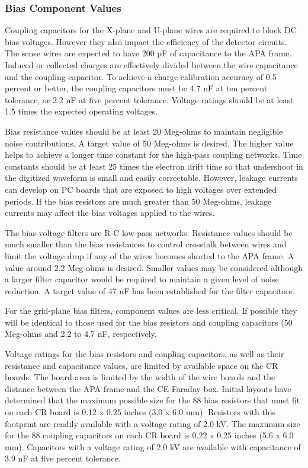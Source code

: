 \subsubsection{Bias Component Values}
\label{subsec:bias_comp_values}

Coupling capacitors for the X-plane and U-plane wires are required to block DC bias voltages. However they also impact the efficiency of the detector circuits. The sense wires are expected to have 200 pF of capacitance to the APA frame. Induced or collected charges are effectively divided between the wire capacitance and the coupling capacitor. To achieve a charge-calibration accuracy of 0.5 percent or better, the coupling capacitors must be 4.7 nF at ten percent tolerance, or 2.2 nF at five percent tolerance. Voltage ratings should be at least 1.5 times the expected operating voltages.

Bias resistance values should be at least 20 Meg-ohms to maintain negligible noise contributions. A target value of 50 Meg-ohms is desired. The higher value helps to achieve a longer time constant for the high-pass coupling networks. Time constants should be at least 25 times the electron drift time so that undershoot in the digitized waveform is small and easily correctable. However, leakage currents can develop on PC boards that are exposed to high voltages over extended periods. If the bias resistors are much greater than 50 Meg-ohms, leakage currents may affect the bias voltages applied to the wires.

The bias-voltage filters are R-C low-pass networks. Resistance values should be much smaller than the bias resistances to control crosstalk between wires and limit the voltage drop if any of the wires becomes shorted to the APA frame.  A value around 2.2 Meg-ohms is desired. Smaller values may be considered although a larger filter capacitor would be required to maintain a given level of noise reduction. A target value of 47 nF has been established for the filter capacitors.

For the grid-plane bias filters, component values are less critical. If possible they will be identical to those used for the bias resistors and coupling capacitors (50 Meg-ohms and 2.2 to 4.7 nF, respectively.

Voltage ratings for the bias resistors and coupling capacitors, as well as their resistance and capacitance values, are limited by available space on the CR boards. The board area is limited by the width of the wire boards and the distance between the APA frame and the CE Faraday box.  Initial layouts have determined that the maximum possible size for the 88 bias resistors that must fit on each CR board is 0.12 x 0.25 inches (3.0 x 6.0 mm). Resistors with this footprint are readily available with a voltage rating of 2.0 kV. The maximum size for the 88 coupling capacitors on each CR board is 0.22 x 0.25 inches (5.6 x 6.0 mm). Capacitors with a voltage rating of 2.0 kV are available with capacitance of 3.9 nF at five percent tolerance.

